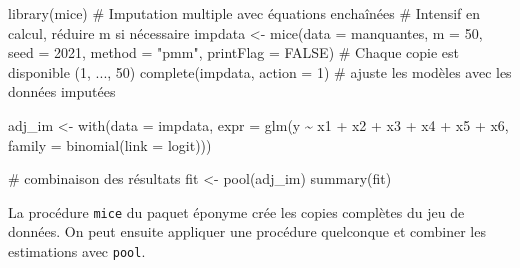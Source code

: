 \documentclass[
  11pt,
  letterpaper,
]{book}
\newenvironment{Shaded}{\begin{snugshade}}{\end{snugshade}}
\newcommand{\AttributeTok}[1]{\textcolor[rgb]{0.40,0.45,0.13}{#1}}
\newcommand{\CommentTok}[1]{\textcolor[rgb]{0.37,0.37,0.37}{#1}}
\newcommand{\ConstantTok}[1]{\textcolor[rgb]{0.56,0.35,0.01}{#1}}
\newcommand{\DecValTok}[1]{\textcolor[rgb]{0.68,0.00,0.00}{#1}}
\newcommand{\FunctionTok}[1]{\textcolor[rgb]{0.28,0.35,0.67}{#1}}
\newcommand{\NormalTok}[1]{\textcolor[rgb]{0.00,0.23,0.31}{#1}}
\newcommand{\OtherTok}[1]{\textcolor[rgb]{0.00,0.23,0.31}{#1}}
\newcommand{\SpecialCharTok}[1]{\textcolor[rgb]{0.37,0.37,0.37}{#1}}
\newcommand{\StringTok}[1]{\textcolor[rgb]{0.13,0.47,0.30}{#1}}
\theoremstyle{definition}
\theoremstyle{remark}
\begin{document}
\begin{Shaded}
\begin{Highlighting}[]
\FunctionTok{library}\NormalTok{(mice)}
\CommentTok{\# Imputation multiple avec équations enchaînées}
\CommentTok{\# Intensif en calcul, réduire \textasciigrave{}m\textasciigrave{} si nécessaire}
\NormalTok{impdata }\OtherTok{\textless{}{-}} \FunctionTok{mice}\NormalTok{(}\AttributeTok{data =}\NormalTok{ manquantes,}
                \AttributeTok{m =} \DecValTok{50}\NormalTok{,}
                \AttributeTok{seed =} \DecValTok{2021}\NormalTok{,}
                \AttributeTok{method =} \StringTok{"pmm"}\NormalTok{,}
                \AttributeTok{printFlag =} \ConstantTok{FALSE}\NormalTok{)}
\CommentTok{\# Chaque copie est disponible (1, ..., 50)}
\FunctionTok{complete}\NormalTok{(impdata, }\AttributeTok{action =} \DecValTok{1}\NormalTok{)}
\CommentTok{\# ajuste les modèles avec les données imputées}

\NormalTok{adj\_im }\OtherTok{\textless{}{-}} \FunctionTok{with}\NormalTok{(}\AttributeTok{data =}\NormalTok{ impdata,}
               \AttributeTok{expr =} \FunctionTok{glm}\NormalTok{(y }\SpecialCharTok{\textasciitilde{}}\NormalTok{ x1 }\SpecialCharTok{+}\NormalTok{ x2 }\SpecialCharTok{+}\NormalTok{ x3 }\SpecialCharTok{+}\NormalTok{ x4 }\SpecialCharTok{+}\NormalTok{ x5 }\SpecialCharTok{+}\NormalTok{ x6,}
                          \AttributeTok{family =} \FunctionTok{binomial}\NormalTok{(}\AttributeTok{link =} \StringTok{\textquotesingle{}logit\textquotesingle{}}\NormalTok{)))}

\CommentTok{\# combinaison des résultats }
\NormalTok{fit }\OtherTok{\textless{}{-}} \FunctionTok{pool}\NormalTok{(adj\_im)}
\FunctionTok{summary}\NormalTok{(fit)}
\end{Highlighting}
\end{Shaded}

La procédure \texttt{mice} du paquet éponyme crée les copies complètes
du jeu de données. On peut ensuite appliquer une procédure quelconque et
combiner les estimations avec \texttt{pool}.
\end{document}
